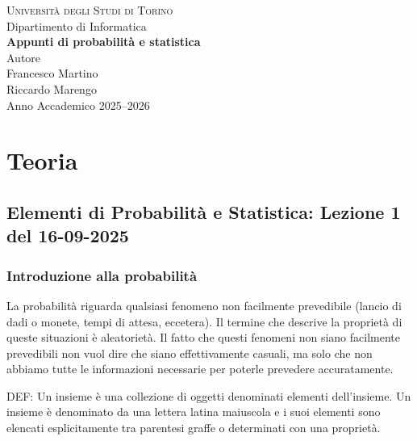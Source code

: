 \documentclass[12pt,a4paper, openany]{book}
\begin{document}
	\begin{titlepage}
		\centering
		
		{\Large \textsc{Università degli Studi di Torino}}\\[0.5cm]
		{\large Dipartimento di Informatica}\\[3cm]
		
		{\Huge \bfseries Appunti di probabilità
			e statistica}\\[0.5cm]
		
		{\large Autore}\\
		{\Large Francesco Martino}\\
		{\Large Riccardo Marengo}\\[1.5cm]
		
		{\large Anno Accademico 2025--2026}
		
		\vfill
		
	\end{titlepage}
	\chapter{Teoria}
	\section{Elementi di Probabilità e Statistica: Lezione 1 del 16-09-2025}
	
	\subsection{Introduzione alla probabilità}
	
	La probabilità riguarda qualsiasi fenomeno non facilmente prevedibile
	(lancio di dadi o monete, tempi di attesa, eccetera).
	Il termine che descrive la proprietà di queste situazioni è aleatorietà.
	Il fatto che questi fenomeni non siano facilmente prevedibili non vuol dire
	che siano effettivamente casuali, ma solo che non abbiamo tutte le
	informazioni necessarie per poterle prevedere accuratamente.
	
	DEF: Un insieme è una collezione di oggetti denominati elementi
	dell'insieme. Un insieme è denominato da una lettera latina
	maiuscola e i suoi elementi sono elencati esplicitamente tra parentesi graffe
	o determinati con una proprietà.
	
\end{document}
